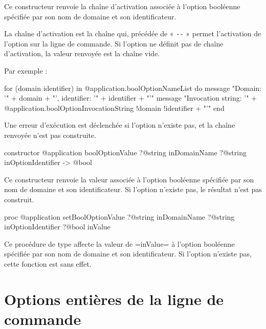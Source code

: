 Ce constructeur renvoie la chaîne d'activation associée à l'option booléenne spécifiée par son nom de domaine et son identificateur.

La chaîne d'activation est la chaîne qui, précédée de « \texttt{-{}-} » permet l'activation de l'option sur la ligne de commande. Si l'option ne définit pas de chaîne d'activation, la valeur renvoyée est la chaîne vide.

 Par exemple :
\begin{galgas}
for (domain identifier) in @application.boolOptionNameList do
  message "Domain: '" + domain + "', identifier: '" + identifier + "'\n"
  message "Invocation string: '"
    + @application.boolOptionInvocationString {!domain !identifier} + "'\n"
end
\end{galgas}

Une erreur d'exécution est déclenchée si l'option n'existe pas, et la chaîne renvoyée n'est pas construite.







\begin{galgasbox}
constructor @application boolOptionValue
    ?@string inDomainName
    ?@string inOptionIdentifier -> @bool
\end{galgasbox}

Ce constructeur renvoie la valeur associée à l'option booléenne spécifiée par son nom de domaine et son identificateur. Si l'option n'existe pas, le résultat n'est pas construit.






\begin{galgasbox}
proc @application setBoolOptionValue
    ?@string inDomainName
    ?@string inOptionIdentifier
    ?@bool inValue
\end{galgasbox}

Ce procédure de type affecte la valeur de \ggs=inValue= à l'option booléenne spécifiée par son nom de domaine et son identificateur. Si l'option n'existe pas, cette fonction est sans effet.







\section{Options entières de la ligne de commande}

